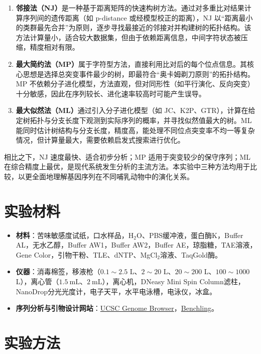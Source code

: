 \documentclass[10pt]{article}
\begin{document}
\begin{enumerate}
    \item \textbf{邻接法（NJ）}是一种基于距离矩阵的快速构树方法。通过对多重比对结果计算序列间的遗传距离（如 p-distance 或经模型校正的距离），NJ 以“距离最小的类群最先合并”为原则，逐步寻找最接近的邻接对并构建树的拓扑结构。该方法计算量小，适合较大数据集，但由于依赖距离信息，中间字符状态被压缩，精度相对有限。
    \item \textbf{最大简约法（MP）}属于字符型方法，直接利用比对后的每个位点信息。其核心思想是选择总突变事件最少的树，即最符合“奥卡姆剃刀原则”的拓扑结构。MP 不依赖分子进化模型，方法直观，但对同形性（如平行演化、反向突变）十分敏感，因此在序列较长、进化速率较高时可能产生误导。
    \item \textbf{最大似然法（ML）}通过引入分子进化模型（如 JC、K2P、GTR），计算在给定树拓扑与分支长度下观测到实际序列的概率，并寻找似然值最大的树。ML 能同时估计树结构与分支长度，精度高，能处理不同位点突变率不均一等复杂情况，但计算量最大，需要依赖启发式搜索进行优化。
\end{enumerate}

相比之下，NJ 速度最快、适合初步分析；MP 适用于突变较少的保守序列；ML 在综合精度上最优，是现代系统发生分析的主流方法。本实验中三种方法均用于比较，以更全面地理解基因序列在不同哺乳动物中的演化关系。

\section{实验材料}
\begin{itemize}
    \item \textbf{材料}：苦味敏感度试纸，口水样品，H$_2$O、PBS缓冲液，蛋白酶K，Buffer AL，无水乙醇，Buffer AW1，Buffer AW2，Buffer AE，琼脂糖，TAE溶液，Gene Color，引物干粉、TLE、dNTP、MgCl$_2$溶液、TaqGold酶。
    \item \textbf{仪器}：消毒棉签，移液枪（$0.1\sim2.5$ \textmu L、$2 \sim 20$ \textmu L、$20 \sim 200$ \textmu L、$100 \sim 1000$ \textmu L），离心管（$\SI{1.5}{\mL}$、$\SI{2}{\mL}$），离心机，DNeasy Mini Spin Column滤柱，NanoDrop分光光度计，电子天平，水平电泳槽，电泳仪，冰盒。
    \item \textbf{序列分析与引物设计网站}：\href{https://genome.ucsc.edu/index.html}{UCSC Genome Browser}，\href{https://www.benchling.com/}{Benchling}。
\end{itemize}

\section{实验方法}
\end{document}
